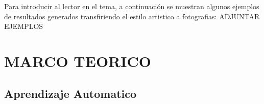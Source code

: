 \documentclass[a4paper,12pt,spanish]{book}
\begin{document}
Para introducir al lector en el tema, a continuación se muestran algunos ejemplos de resultados generados transfiriendo el estilo artistico a fotografias:
ADJUNTAR EJEMPLOS

\iffalse
Tener en cuenta:
In fine art, especially painting, humans have mastered the skill to create unique
visual experiences through composing a complex interplay between the con-
tent and style of an image. Thus far the algorithmic basis of this process is
unknown and there exists no artificial system with similar capabilities. How-
ever, in other key areas of visual perception such as object and face recognition
near-human performance was recently demonstrated by a class of biologically
inspired vision models called Deep Neural Networks. 1, 2 Here we introduce an
artificial system based on a Deep Neural Network that creates artistic images
of high perceptual quality. The system uses neural representations to sepa-
rate and recombine content and style of arbitrary images, providing a neural
algorithm for the creation of artistic images. Moreover, in light of the strik-
ing similarities between performance-optimised artificial neural networks and
biological vision, 3–7 our work offers a path forward to an algorithmic under-
standing of how humans create and perceive artistic imagery.
\fi

\chapter{MARCO TEORICO}




  \section{Aprendizaje Automatico}
\end{document}
